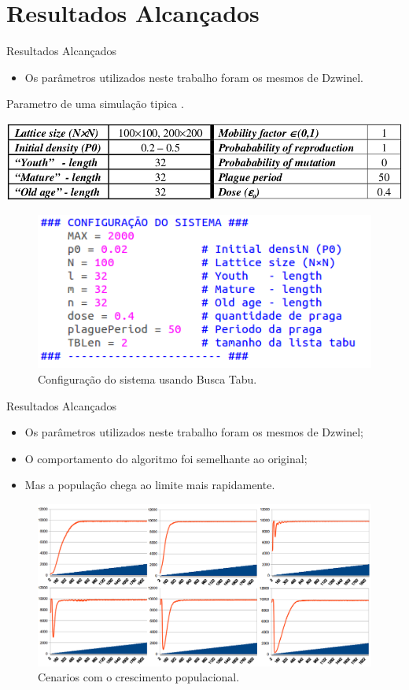 \documentclass{beamer}
\begin{document}
\section{Resultados Alcançados}
\begin{frame}{Resultados Alcançados}
	\begin{itemize}
		\item Os parâmetros utilizados neste trabalho foram os mesmos de
		Dzwinel.
	\end{itemize}
\begin{table}[ht]
\centering
\caption{Parametro de uma simulação tipica \cite{dzwinel:04}.}
\label{tab:parametro-simulacao}
\includegraphics[width=.7\textwidth]{../artigo/imagens/parametro-simulacao}
\end{table}

\begin{figure}[h!]
\centering
\includegraphics[width=.5\textwidth]{../artigo/imagens/configuracao-bt}
\caption{Configuração do sistema usando Busca Tabu.}
\label{fig:configuracao-br}
\end{figure}

\end{frame}

\begin{frame}{Resultados Alcançados}
	\begin{itemize}
		\item Os parâmetros utilizados neste trabalho foram os mesmos de
		Dzwinel;
		\item O comportamento do algoritmo foi semelhante ao original;
		\item Mas a população chega ao limite mais rapidamente.
	\end{itemize}
\begin{figure}[h!]
\centering
\includegraphics[width=.7\textwidth]{../artigo/imagens/cenarios}
\caption{Cenarios com o crescimento populacional.}
\label{fig:cenarios}
\end{figure}
\end{frame}
\end{document}
